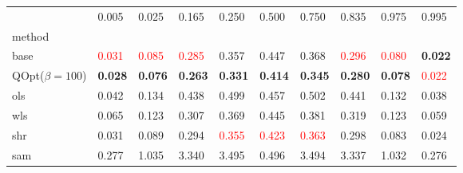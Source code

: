 \begin{tabular}{llllllllll}
\toprule
 & 0.005 & 0.025 & 0.165 & 0.250 & 0.500 & 0.750 & 0.835 & 0.975 & 0.995 \\
method &  &  &  &  &  &  &  &  &  \\
\midrule
base & \textcolor{red}{0.031} & \textcolor{red}{0.085} & \textcolor{red}{0.285} & 0.357 & 0.447 & 0.368 & \textcolor{red}{0.296} & \textcolor{red}{0.080} & \textbf{0.022} \\
\midrule
QOpt($\beta=100$) & \textbf{0.028} & \textbf{0.076} & \textbf{0.263} & \textbf{0.331} & \textbf{0.414} & \textbf{0.345} & \textbf{0.280} & \textbf{0.078} & \textcolor{red}{0.022} \\
ols & 0.042 & 0.134 & 0.438 & 0.499 & 0.457 & 0.502 & 0.441 & 0.132 & 0.038 \\
wls & 0.065 & 0.123 & 0.307 & 0.369 & 0.445 & 0.381 & 0.319 & 0.123 & 0.059 \\
shr & 0.031 & 0.089 & 0.294 & \textcolor{red}{0.355} & \textcolor{red}{0.423} & \textcolor{red}{0.363} & 0.298 & 0.083 & 0.024 \\
sam & 0.277 & 1.035 & 3.340 & 3.495 & 0.496 & 3.494 & 3.337 & 1.032 & 0.276 \\
\bottomrule
\end{tabular}
